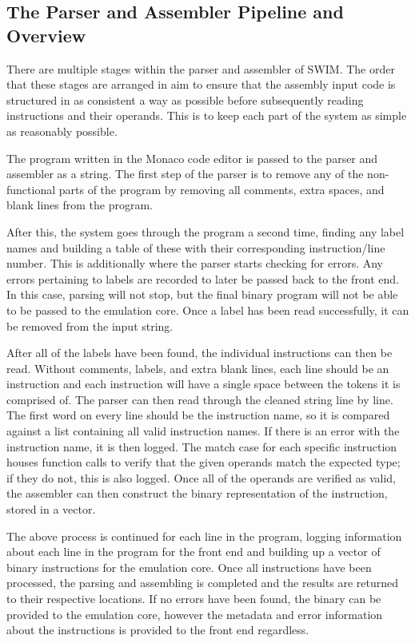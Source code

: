 \documentclass[
    paper=letter,
    parskip=half,
    fontsize=12pt,
    titlepage=firstiscover,
    toc=bibliography,
    numbers=endperiod
]{scrartcl}
\begin{document}
\subsection{The Parser and Assembler Pipeline and Overview}

There are multiple stages within the parser and assembler of SWIM. The
order that these stages are arranged in aim to ensure that the assembly
input code is structured in as consistent a way as possible before
subsequently reading instructions and their operands. This is to keep
each part of the system as simple as reasonably possible.

The program written in the Monaco code editor is passed to the parser
and assembler as a string. The first step of the parser is to remove any
of the non-functional parts of the program by removing all comments,
extra spaces, and blank lines from the program.

After this, the system goes through the program a second time, finding
any label names and building a table of these with their corresponding
instruction/line number. This is additionally where the parser starts
checking for errors. Any errors pertaining to labels are recorded to
later be passed back to the front end. In this case, parsing will not
stop, but the final binary program will not be able to be passed to the
emulation core. Once a label has been read successfully, it can be
removed from the input string.

After all of the labels have been found, the individual instructions can
then be read. Without comments, labels, and extra blank lines, each line
should be an instruction and each instruction will have a single space
between the tokens it is comprised of. The parser can then read through
the cleaned string line by line. The first word on every line should be
the instruction name, so it is compared against a list containing all
valid instruction names. If there is an error with the instruction name,
it is then logged. The match case for each specific instruction houses
function calls to verify that the given operands match the expected
type; if they do not, this is also logged. Once all of the operands are
verified as valid, the assembler can then construct the binary
representation of the instruction, stored in a vector.

The above process is continued for each line in the program, logging
information about each line in the program for the front end and
building up a vector of binary instructions for the emulation core. Once
all instructions have been processed, the parsing and assembling is
completed and the results are returned to their respective locations. If
no errors have been found, the binary can be provided to the emulation
core, however the metadata and error information about the instructions
is provided to the front end regardless.
\end{document}
